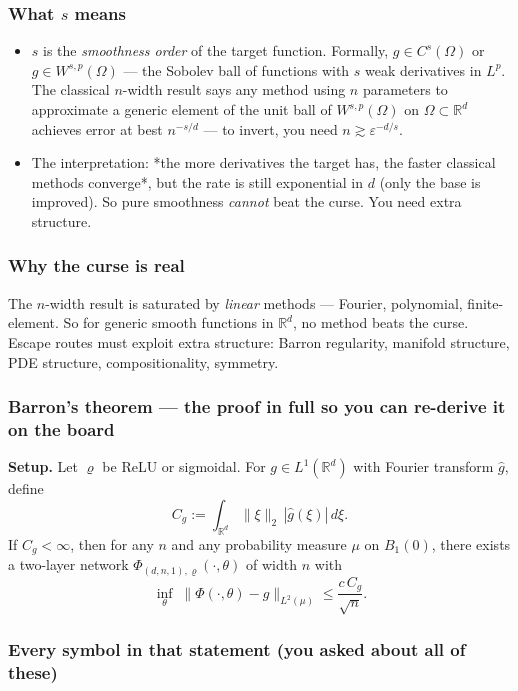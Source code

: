 \documentclass[11pt]{article}
\begin{document}
\subsubsection*{What $s$ means}

\begin{itemize}
\item $s$ is the \emph{smoothness order} of the target function. Formally, $g \in
  C^s(\Omega)$ or $g \in W^{s,p}(\Omega)$ --- the Sobolev ball of functions
with $s$ weak derivatives in $L^p$. The classical $n$-width result says
any method using $n$ parameters to approximate a generic element of the
unit ball of $W^{s, p}(\Omega)$ on $\Omega \subset \mathbb R^d$ achieves
error at best $n^{-s/d}$ --- to invert, you need $n \gtrsim
  \varepsilon^{-d/s}$.
\item The interpretation: *the more derivatives the target has, the faster
classical methods converge*, but the rate is still exponential in $d$
(only the base is improved). So pure smoothness \emph{cannot} beat the curse.
You need extra structure.
\end{itemize}
\subsubsection*{Why the curse is real}

The $n$-width result is saturated by \emph{linear} methods --- Fourier, polynomial,
finite-element. So for generic smooth functions in $\mathbb R^d$, no method
beats the curse. Escape routes must exploit extra structure: Barron
regularity, manifold structure, PDE structure, compositionality, symmetry.

\subsubsection*{Barron's theorem --- the proof in full so you can re-derive it on the board}

\textbf{Setup.} Let $\varrho$ be ReLU or sigmoidal. For $g \in L^1(\mathbb R^d)$
with Fourier transform $\hat g$, define
\[C_g := \int_{\mathbb R^d} \|\xi\|_2 \, |\hat g(\xi)| \, d\xi.\]
If $C_g < \infty$, then for any $n$ and any probability measure $\mu$ on
$B_1(0)$, there exists a two-layer network
$\Phi_{(d, n, 1), \varrho}(\cdot, \theta)$ of width $n$ with
\[\inf_{\theta}\;\|\Phi(\cdot,\theta) - g\|_{L^2(\mu)} \le \frac{c \, C_g}{\sqrt n}.\]

\subsubsection*{Every symbol in that statement (you asked about all of these)}
\end{document}
